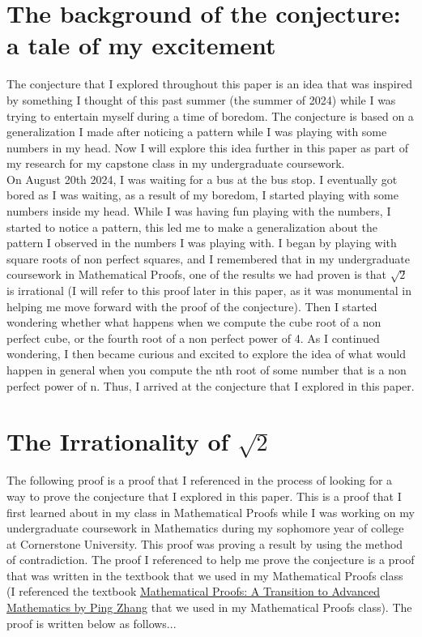 \documentclass{turabian-researchpaper}
\begin{document}
\section{The background of the conjecture: a tale of my excitement}  
\label{sec:headings}
The conjecture that I explored throughout this paper is an idea that was inspired by something I thought of this past summer (the summer of 2024) while I was trying to entertain myself during a time of boredom. The conjecture is based on a generalization I made after noticing a pattern while I was playing with some numbers in my head. Now I will explore this idea further in this paper as part of my research for my capstone class in my undergraduate coursework.  \\ 
On August 20th 2024, I was waiting for a bus at the bus stop. I eventually got bored as I was waiting, as a result of my boredom, I started playing with some numbers inside my head. While I was having fun playing with the numbers, I started to notice a pattern, this led me to make a generalization about the pattern I observed in the numbers I was playing with. I began by playing with square roots of non perfect squares, and I remembered that in my undergraduate coursework in Mathematical Proofs, one of the results we had proven is that $\sqrt{2}$ is irrational (I will refer to this proof later in this paper, as it was monumental in helping me move forward with the proof of the conjecture). Then I started wondering whether what happens when we compute the cube root of a non perfect cube, or the fourth root of a non perfect power of 4. As I continued wondering, I then became curious and excited to explore the idea of what would happen in general when you compute the nth root of some number that is a non perfect power of n. Thus, I arrived at the conjecture that I explored in this paper.  

\section{The Irrationality of \(\sqrt{2}\)} 

The following proof is a proof that I referenced in the process of looking for a way to prove the conjecture that I explored in this paper. This is a proof that I first learned about in my class in Mathematical Proofs while I was working on my undergraduate coursework in Mathematics during my sophomore year of college at Cornerstone University. This proof was proving a result by using the method of contradiction. The proof I referenced to help me prove the conjecture is a proof that was written in the textbook that we used in my Mathematical Proofs class (I referenced the textbook \href{https://www.amazon.com/Mathematical-Proofs-Transition-Advanced-Mathematics/dp/0134746759}{Mathematical Proofs: A Transition to Advanced Mathematics by Ping Zhang} that we used in my Mathematical Proofs class). The proof is written below as follows...  
\end{document}
